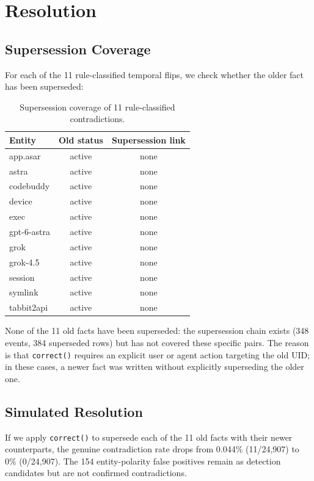 \documentclass{article}
\begin{document}
\section{Resolution}
\label{sec:resolve}

\subsection{Supersession Coverage}
For each of the 11 rule-classified temporal flips, we check whether the older fact has been superseded:

\begin{table}[h]
\centering
\caption{Supersession coverage of 11 rule-classified contradictions.}
\begin{tabular}{lcc}
\toprule
Entity & Old status & Supersession link \\
\midrule
app.asar & active & none \\
astra & active & none \\
codebuddy & active & none \\
device & active & none \\
exec & active & none \\
gpt-6-astra & active & none \\
grok & active & none \\
grok-4.5 & active & none \\
session & active & none \\
symlink & active & none \\
tabbit2api & active & none \\
\bottomrule
\end{tabular}
\end{table}

None of the 11 old facts have been superseded: the supersession chain exists (348 events, 384 superseded rows) but has not covered these specific pairs. The reason is that \texttt{correct()} requires an explicit user or agent action targeting the old UID; in these cases, a newer fact was written without explicitly superseding the older one.

\subsection{Simulated Resolution}
If we apply \texttt{correct()} to supersede each of the 11 old facts with their newer counterparts, the genuine contradiction rate drops from 0.044\% (11/24{,}907) to 0\% (0/24{,}907). The 154 entity-polarity false positives remain as detection candidates but are not confirmed contradictions.
\end{document}
